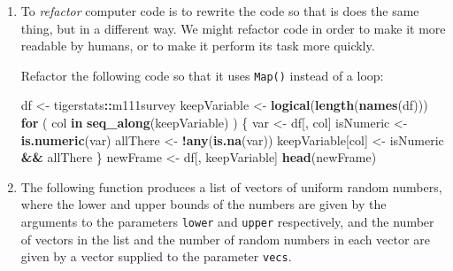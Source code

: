 \documentclass[]{book}
\makeatletter
\newenvironment{Shaded}{\begin{snugshade}}{\end{snugshade}}
\newcommand{\KeywordTok}[1]{\textcolor[rgb]{0.13,0.29,0.53}{\textbf{#1}}}
\newcommand{\StringTok}[1]{\textcolor[rgb]{0.31,0.60,0.02}{#1}}
\newcommand{\ControlFlowTok}[1]{\textcolor[rgb]{0.13,0.29,0.53}{\textbf{#1}}}
\newcommand{\OperatorTok}[1]{\textcolor[rgb]{0.81,0.36,0.00}{\textbf{#1}}}
\newcommand{\NormalTok}[1]{#1}
\newenvironment{kframe}{%
\medskip{}
\setlength{\fboxsep}{.8em}
 \def\at@end@of@kframe{}%
 \ifinner\ifhmode%
  \def\at@end@of@kframe{\end{minipage}}%
  \begin{minipage}{\columnwidth}%
 \fi\fi%
 \def\FrameCommand##1{\hskip\@totalleftmargin \hskip-\fboxsep
 \colorbox{shadecolor}{##1}\hskip-\fboxsep
     \hskip-\linewidth \hskip-\@totalleftmargin \hskip\columnwidth}%
 \MakeFramed {\advance\hsize-\width
   \@totalleftmargin\z@ \linewidth\hsize
   \@setminipage}}%
 {\par\unskip\endMakeFramed%
 \at@end@of@kframe}
\renewenvironment{Shaded}{\begin{kframe}}{\end{kframe}}
\theoremstyle{definition}
\theoremstyle{definition}
\theoremstyle{definition}
\theoremstyle{remark}
\makeatother
\begin{document}
{\begin{enumerate}
\begin{Shaded}
\begin{Highlighting}[]
\KeywordTok{Map}\NormalTok{(}\ControlFlowTok{function}\NormalTok{(x) }\KeywordTok{sqrt}\NormalTok{(x), y)}
\end{Highlighting}
\end{Shaded}

  Or this code?

\begin{Shaded}
\begin{Highlighting}[]
  \KeywordTok{sqrt}\NormalTok{(y)}
\end{Highlighting}
\end{Shaded}

  Justify your answer with a convincing example, using
  \texttt{system.time()}. What moral do you draw from this?
\item
  To \emph{refactor} computer code is to rewrite the
  code so that is does the same thing, but in a different way. We might
  refactor code in order to make it more readable by humans, or to make
  it perform its task more quickly.

  Refactor the following code so that it uses \texttt{Map()} instead of
  a loop:

\begin{Shaded}
\begin{Highlighting}[]
\NormalTok{df <-}\StringTok{ }\NormalTok{tigerstats}\OperatorTok{::}\NormalTok{m111survey}
\NormalTok{keepVariable <-}\StringTok{ }\KeywordTok{logical}\NormalTok{(}\KeywordTok{length}\NormalTok{(}\KeywordTok{names}\NormalTok{(df)))}
\ControlFlowTok{for}\NormalTok{ ( col }\ControlFlowTok{in} \KeywordTok{seq_along}\NormalTok{(keepVariable) ) \{}
\NormalTok{  var <-}\StringTok{ }\NormalTok{df[, col]}
\NormalTok{  isNumeric <-}\StringTok{ }\KeywordTok{is.numeric}\NormalTok{(var)}
\NormalTok{  allThere <-}\StringTok{ }\OperatorTok{!}\KeywordTok{any}\NormalTok{(}\KeywordTok{is.na}\NormalTok{(var))}
\NormalTok{  keepVariable[col] <-}\StringTok{ }\NormalTok{isNumeric }\OperatorTok{&&}\StringTok{ }\NormalTok{allThere}
\NormalTok{\}}
\NormalTok{newFrame <-}\StringTok{ }\NormalTok{df[, keepVariable]}
\KeywordTok{head}\NormalTok{(newFrame)}
\end{Highlighting}
\end{Shaded}
\item
  The following function produces a list of vectors of uniform random
  numbers, where the lower and upper bounds of the numbers are given by
  the arguments to the parameters \texttt{lower} and \texttt{upper}
  respectively, and the number of vectors in the list and the number of
  random numbers in each vector are given by a vector supplied to the
  parameter \texttt{vecs}.


\end{enumerate}}
\end{document}

